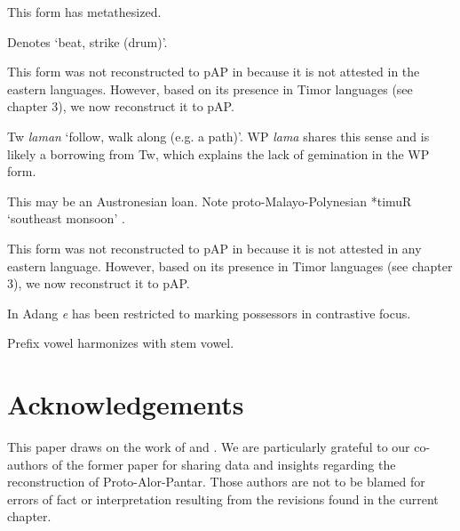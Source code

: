 {\tablenotetext}{This form has metathesized. }

{\tablenotetext}{Denotes `beat, strike (drum)'.}

{\tablenotetext}{This form was not reconstructed to pAP in \citet{HoltonEtAl2012} because it is not attested in the eastern languages. However, based on its presence in Timor languages (see chapter 3), we now reconstruct it to pAP.}

{\tablenotetext}{Tw\textit{ laman }`follow, walk along (e.g. a path)'. WP \textit{lama }shares this sense and is likely a borrowing from Tw, which explains the lack of gemination in the WP form. }

{\tablenotetext}{This may be an Austronesian loan. Note proto-Malayo-Polynesian *timuR `southeast monsoon'  \citep{BlustEtAl2010}.}

{\tablenotetext}{This form was not reconstructed to pAP in \citet{HoltonEtAl2012} because it is not attested in any eastern language. However, based on its presence in Timor languages (see chapter 3), we now reconstruct it to pAP. }

{\tablenotetext}{In Adang \textit{{\textglotstop}}\textit{e} has been restricted to marking possessors in contrastive focus.}

{\tablenotetext}{Prefix vowel harmonizes with stem vowel.}


\section*{Acknowledgements}

This paper draws on the work of \citet{HoltonEtAl2012} and \citet{RobinsonEtAl2012internal}. We are particularly grateful to our co-authors of the former paper for sharing data and insights regarding the reconstruction of Proto-Alor-Pantar. Those authors are not to be blamed for errors of fact or interpretation resulting from the revisions found in the current chapter.

 
